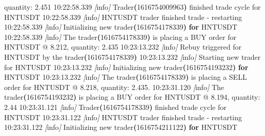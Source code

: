 \documentclass[
  oneside]{book}
\newenvironment{Shaded}{\begin{snugshade}}{\end{snugshade}}
\newcommand{\AttributeTok}[1]{\textcolor[rgb]{0.13,0.29,0.53}{#1}}
\newcommand{\ControlFlowTok}[1]{\textcolor[rgb]{0.13,0.29,0.53}{\textbf{#1}}}
\newcommand{\ErrorTok}[1]{\textcolor[rgb]{0.64,0.00,0.00}{\textbf{#1}}}
\newcommand{\ExtensionTok}[1]{#1}
\newcommand{\KeywordTok}[1]{\textcolor[rgb]{0.13,0.29,0.53}{\textbf{#1}}}
\newcommand{\NormalTok}[1]{#1}
\newcommand{\PreprocessorTok}[1]{\textcolor[rgb]{0.56,0.35,0.01}{\textit{#1}}}
\newcommand{\SpecialStringTok}[1]{\textcolor[rgb]{0.31,0.60,0.02}{#1}}
\begin{document}
\begin{Shaded}
\begin{Highlighting}[]
\ExtensionTok{quantity:}\NormalTok{ 2.451}
\ExtensionTok{10:22:58.339} \PreprocessorTok{[}\SpecialStringTok{info}\PreprocessorTok{]}\NormalTok{  Trader}\ErrorTok{(}\ExtensionTok{1616754009963}\KeywordTok{)} \ExtensionTok{finished}\NormalTok{ trade cycle for HNTUSDT}
\ExtensionTok{10:22:58.339} \PreprocessorTok{[}\SpecialStringTok{info}\PreprocessorTok{]}\NormalTok{  HNTUSDT trader finished trade }\AttributeTok{{-}}\NormalTok{ restarting}
\ExtensionTok{10:22:58.339} \PreprocessorTok{[}\SpecialStringTok{info}\PreprocessorTok{]}\NormalTok{  Initializing new trader}\ErrorTok{(}\ExtensionTok{1616754178339}\KeywordTok{)} \ControlFlowTok{for}\NormalTok{ HNTUSDT}
\ExtensionTok{10:22:58.339} \PreprocessorTok{[}\SpecialStringTok{info}\PreprocessorTok{]}\NormalTok{  The trader}\ErrorTok{(}\ExtensionTok{1616754178339}\KeywordTok{)} \ExtensionTok{is}\NormalTok{ placing a BUY order for HNTUSDT @ 8.212,}
\ExtensionTok{quantity:}\NormalTok{ 2.435}
\ExtensionTok{10:23:13.232} \PreprocessorTok{[}\SpecialStringTok{info}\PreprocessorTok{]}\NormalTok{  Rebuy triggered for HNTUSDT by the trader}\ErrorTok{(}\ExtensionTok{1616754178339}\KeywordTok{)}
\ExtensionTok{10:23:13.232} \PreprocessorTok{[}\SpecialStringTok{info}\PreprocessorTok{]}\NormalTok{  Starting new trader for HNTUSDT}
\ExtensionTok{10:23:13.232} \PreprocessorTok{[}\SpecialStringTok{info}\PreprocessorTok{]}\NormalTok{  Initializing new trader}\ErrorTok{(}\ExtensionTok{1616754193232}\KeywordTok{)} \ControlFlowTok{for}\NormalTok{ HNTUSDT}
\ExtensionTok{10:23:13.232} \PreprocessorTok{[}\SpecialStringTok{info}\PreprocessorTok{]}\NormalTok{  The trader}\ErrorTok{(}\ExtensionTok{1616754178339}\KeywordTok{)} \ExtensionTok{is}\NormalTok{ placing a SELL order for HNTUSDT @ 8.218,}
\ExtensionTok{quantity:}\NormalTok{ 2.435.}
\ExtensionTok{10:23:31.120} \PreprocessorTok{[}\SpecialStringTok{info}\PreprocessorTok{]}\NormalTok{  The trader}\ErrorTok{(}\ExtensionTok{1616754193232}\KeywordTok{)} \ExtensionTok{is}\NormalTok{ placing a BUY order for HNTUSDT @ 8.194,}
\ExtensionTok{quantity:}\NormalTok{ 2.44}
\ExtensionTok{10:23:31.121} \PreprocessorTok{[}\SpecialStringTok{info}\PreprocessorTok{]}\NormalTok{  Trader}\ErrorTok{(}\ExtensionTok{1616754178339}\KeywordTok{)} \ExtensionTok{finished}\NormalTok{ trade cycle for HNTUSDT}
\ExtensionTok{10:23:31.122} \PreprocessorTok{[}\SpecialStringTok{info}\PreprocessorTok{]}\NormalTok{  HNTUSDT trader finished trade }\AttributeTok{{-}}\NormalTok{ restarting}
\ExtensionTok{10:23:31.122} \PreprocessorTok{[}\SpecialStringTok{info}\PreprocessorTok{]}\NormalTok{  Initializing new trader}\ErrorTok{(}\ExtensionTok{1616754211122}\KeywordTok{)} \ControlFlowTok{for}\NormalTok{ HNTUSDT}

\end{Highlighting}
\end{Shaded}
\end{document}
